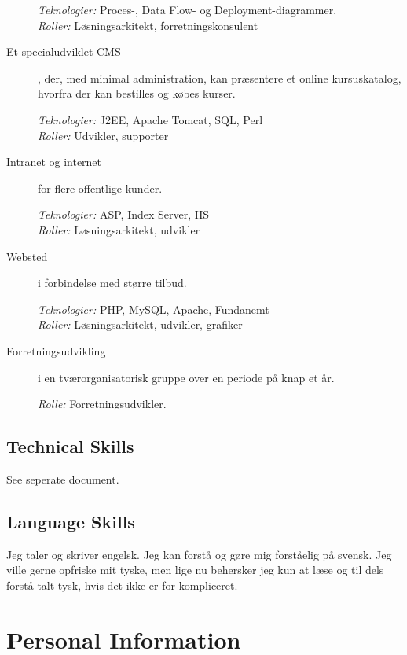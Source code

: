 \documentclass[a4paper,11pt]{article}
\begin{document}
\begin{description}
  \textit{Teknologier:} Proces-, Data Flow- og Deployment-diagrammer.\\
  \textit{Roller:} Løsningsarkitekt, forretningskonsulent

\item[Et specialudviklet CMS], der, med minimal
  administration, kan præsentere et online kursuskatalog,
  hvorfra der kan bestilles og købes kurser.

  \textit{Teknologier:} J2EE, Apache Tomcat, SQL, Perl\\
  \textit{Roller:} Udvikler, supporter

\item[Intranet og internet] for flere offentlige kunder.

  \textit{Teknologier:} ASP, Index Server, IIS\\
  \textit{Roller:} Løsningsarkitekt, udvikler

\item[Websted] i forbindelse med større tilbud.

  \textit{Teknologier:} PHP, MySQL, Apache, Fundanemt\\
  \textit{Roller:} Løsningsarkitekt, udvikler, grafiker

\item[Forretningsudvikling] i en
  tværorganisatorisk gruppe over en periode på knap et
  år.

  \textit{Rolle:} Forretningsudvikler.

\end{description}

\subsection*{Technical Skills}

See seperate document.

\subsection*{Language Skills}

Jeg taler og skriver engelsk. Jeg kan forstå og gøre mig forståelig på
svensk. Jeg ville gerne opfriske mit tyske, men lige nu behersker jeg
kun at læse og til dels forstå talt tysk, hvis det ikke er for
kompliceret.


\section*{Personal Information}
\end{document}
